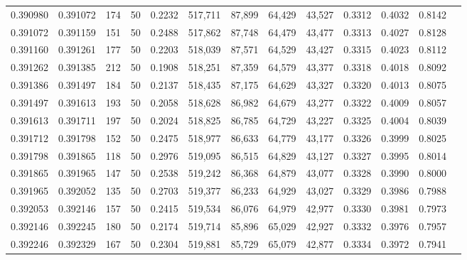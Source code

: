 \begin{tabular}{rrrrrrrrrrrrr}
0.390980 & 0.391072 &   174 &  50 &                                     0.2232 & 517,711 &  87,899 &  64,429 &  43,527 & 0.3312 & 0.4032 & 0.8142 \\
0.391072 & 0.391159 &   151 &  50 &                                     0.2488 & 517,862 &  87,748 &  64,479 &  43,477 & 0.3313 & 0.4027 & 0.8128 \\
0.391160 & 0.391261 &   177 &  50 &                                     0.2203 & 518,039 &  87,571 &  64,529 &  43,427 & 0.3315 & 0.4023 & 0.8112 \\
0.391262 & 0.391385 &   212 &  50 &                                     0.1908 & 518,251 &  87,359 &  64,579 &  43,377 & 0.3318 & 0.4018 & 0.8092 \\
0.391386 & 0.391497 &   184 &  50 &                                     0.2137 & 518,435 &  87,175 &  64,629 &  43,327 & 0.3320 & 0.4013 & 0.8075 \\
0.391497 & 0.391613 &   193 &  50 &                                     0.2058 & 518,628 &  86,982 &  64,679 &  43,277 & 0.3322 & 0.4009 & 0.8057 \\
0.391613 & 0.391711 &   197 &  50 &                                     0.2024 & 518,825 &  86,785 &  64,729 &  43,227 & 0.3325 & 0.4004 & 0.8039 \\
0.391712 & 0.391798 &   152 &  50 &                                     0.2475 & 518,977 &  86,633 &  64,779 &  43,177 & 0.3326 & 0.3999 & 0.8025 \\
0.391798 & 0.391865 &   118 &  50 &                                     0.2976 & 519,095 &  86,515 &  64,829 &  43,127 & 0.3327 & 0.3995 & 0.8014 \\
0.391865 & 0.391965 &   147 &  50 &                                     0.2538 & 519,242 &  86,368 &  64,879 &  43,077 & 0.3328 & 0.3990 & 0.8000 \\
0.391965 & 0.392052 &   135 &  50 &                                     0.2703 & 519,377 &  86,233 &  64,929 &  43,027 & 0.3329 & 0.3986 & 0.7988 \\
0.392053 & 0.392146 &   157 &  50 &                                     0.2415 & 519,534 &  86,076 &  64,979 &  42,977 & 0.3330 & 0.3981 & 0.7973 \\
0.392146 & 0.392245 &   180 &  50 &                                     0.2174 & 519,714 &  85,896 &  65,029 &  42,927 & 0.3332 & 0.3976 & 0.7957 \\
0.392246 & 0.392329 &   167 &  50 &                                     0.2304 & 519,881 &  85,729 &  65,079 &  42,877 & 0.3334 & 0.3972 & 0.7941 \\

\end{tabular}
